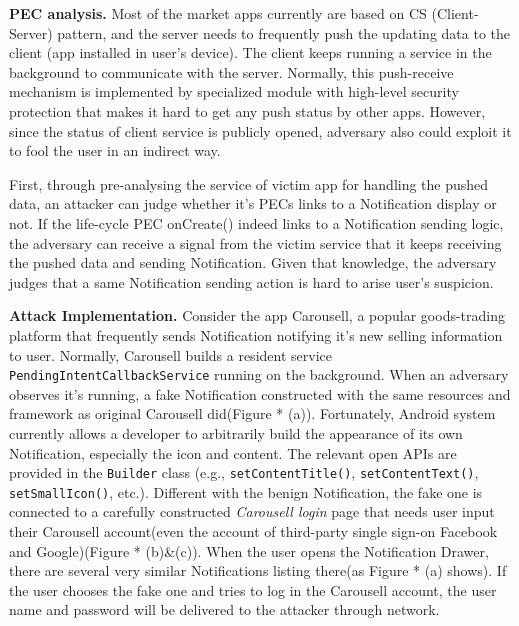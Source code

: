 

\textbf{PEC analysis.}
Most of the market apps currently are based on CS (Client-Server) pattern, and the server needs to frequently push the updating data to the client (app installed in user's device). The client keeps running a service in the background to communicate with the server. Normally, this push-receive mechanism is implemented by specialized module with high-level security protection that makes it hard to get any push status by other apps. However, since the status of client service is publicly opened, adversary also could exploit it to fool the user in an indirect way. 

First, through pre-analysing the service of victim app for handling the pushed data, an attacker can judge whether it's PECs links to a Notification display or not. If the life-cycle PEC onCreate() indeed links to a Notification sending logic, the adversary can receive a signal from the victim service that it keeps receiving the pushed data and sending Notification. Given that knowledge, the adversary judges that a same Notification sending action is hard to arise user's suspicion.   


\textbf{Attack Implementation.}
Consider the app Carousell, a popular goods-trading platform that frequently sends Notification notifying it's new selling information to user. Normally, Carousell builds a resident service \texttt{PendingIntentCallbackService} running on the background. When an adversary observes it's running, a fake Notification constructed with the same resources and framework as original Carousell did(Figure * (a)). Fortunately, Android system currently allows a developer to arbitrarily build the appearance of its own Notification, especially the icon and content. The relevant open APIs are provided in the \texttt{Builder} class (e.g., \texttt{setContentTitle()}, \texttt{setContentText()}, \texttt{setSmallIcon()}, etc.). Different with the benign Notification, the fake one is connected to a carefully constructed \textit{Carousell login} page that needs user input their Carousell account(even the account of third-party single sign-on Facebook and Google)(Figure * (b)\&(c)). When the user opens the Notification Drawer, there are several very similar Notifications listing there(as Figure * (a) shows). If the user chooses the fake one and tries to log in the Carousell account, the user name and password will be delivered to the attacker through network.



